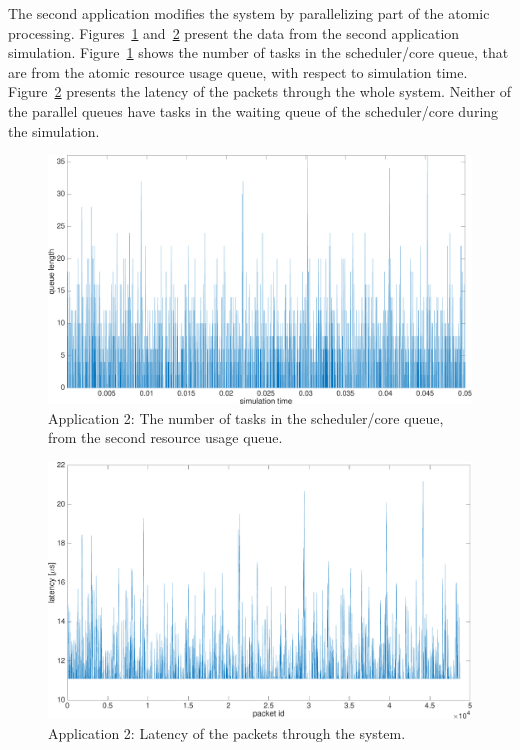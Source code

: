 The second application modifies the system by parallelizing part of the atomic processing. Figures~\ref{fig:app2-queue2} and~\ref{fig:app2-latency} present the data from the second application simulation. Figure~\ref{fig:app2-queue2} shows the number of tasks in the scheduler/core queue, that are from the atomic resource usage queue, with respect to simulation time. Figure~\ref{fig:app2-latency} presents the latency of the packets through the whole system. Neither of the parallel queues have tasks in the waiting queue of the scheduler/core during the simulation.

\begin{figure}[]
  \begin{center}
    \includegraphics[width=\textwidth]{images/experiment/app2-queue2.pdf}
    \caption{Application 2: The number of tasks in the scheduler/core queue, from the second resource usage queue.}
    \label{fig:app2-queue2}
  \end{center}
\end{figure}

\begin{figure}[]
  \begin{center}
    \includegraphics[width=\textwidth]{images/experiment/app2-latency.pdf}
    \caption{Application 2: Latency of the packets through the system.}
    \label{fig:app2-latency}
  \end{center}
\end{figure}

